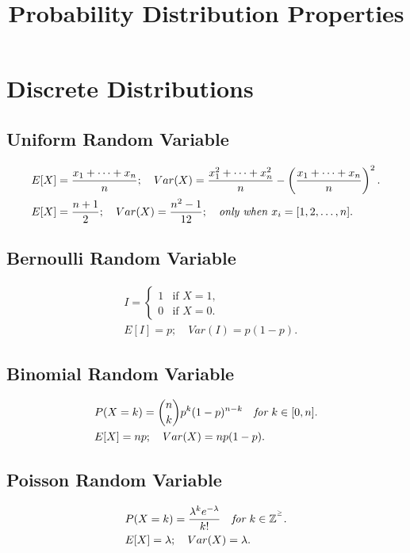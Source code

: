 \documentclass{article}
\title{Probability Distribution Properties}
\begin{document}
 
\date{}

\maketitle 
\section{Discrete Distributions}
\subsection{Uniform Random Variable}
\begin{align}
    & E[X] = \frac{x_1 + \dots + x_n}{n}; \quad Var(X) = \frac{x_1^2 + \dots + x_n^2}{n} - \left(\frac{x_1 + \dots + x_n}{n}\right)^2. \nonumber \\
    & E[X] = \frac{n+1}{2}; \quad Var(X) = \frac{n^2-1}{12}; \quad \emph{only when $x_i = [1, 2, \dots, n]$}. \nonumber
\end{align}

\subsection{Bernoulli Random Variable}
\begin{align}
    & I = \begin{cases}
        1 & \text{if $X = 1$}, \\
        0 & \text{if $X = 0$}.
    \end{cases} \nonumber \\
    & E[I] = p; \quad Var(I) = p(1-p). \nonumber
\end{align}

\subsection{Binomial Random Variable}
\begin{align}
    & P(X=k) = {n\choose k}p^k(1-p)^{n-k} \quad \emph{for } k \in [0,n]. \nonumber \\
    & E[X] = np; \quad Var(X) = np(1-p). \nonumber
\end{align}

\subsection{Poisson Random Variable}
\begin{align}
    & P(X=k) = \frac{\lambda^k e^{-\lambda}}{k!} \quad \emph{for } k \in \mathbb{Z}^{^\ge}. \nonumber \\
    & E[X] = \lambda; \quad Var(X) = \lambda. \nonumber
\end{align}
\end{document}
